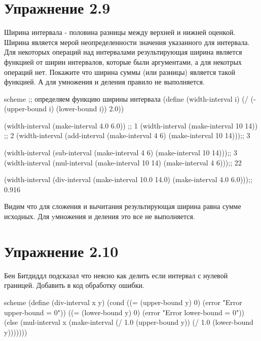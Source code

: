 \chapter{Упражнение 2.9}

Ширина интервала - половина разницы между верхней и нижней оценкой. Ширина является мерой неопределенности значения указанного для интервала. Для некоторых операций над интервалами результирующая ширина является функцией от ширин интервалов, которые были аргументами, а для некотрых операций нет. Покажите что ширина суммы (или разницы) является такой функцией. А для умножения и деления правило не выполняется.

\begin{codelisting}{scheme}
;; определяем функцию ширины интервала
(define (width-interval i)
  (/ (- (upper-bound i) (lower-bound i)) 2.0))

(width-interval (make-interval 4.0 6.0)) ;; 1
(width-interval (make-interval 10 14)) ;; 2
(width-interval (add-interval (make-interval 4 6)
                              (make-interval 10 14)));; 3

(width-interval (sub-interval (make-interval 4 6)
                              (make-interval 10 14)));; 3
(width-interval (mul-interval (make-interval 10 14)
                              (make-interval 4 6)));; 22

(width-interval (div-interval (make-interval 10.0 14.0)
                              (make-interval 4.0 6.0)));; 0.916
\end{codelisting}

Видим что для сложения и вычитания результирующая ширина равна сумме исходных.
Для yмножения и деления это все не выполняется.


\chapter{Упражнение 2.10}

Бен Битдиддл подсказал что неясно как делить если интервал с нулевой границей. Добавить в код обработку ошибки.


\begin{codelisting}{scheme}
(define (div-interval x y)
  (cond ((= (upper-bound y) 0) (error "Error upper-bound = 0"))
        ((= (lower-bound y) 0) (error "Error lower-bound = 0"))
        (else
         (mul-interval x
                       (make-interval (/ 1.0 (upper-bound y))
                                      (/ 1.0 (lower-bound y)))))))
\end{codelisting}


